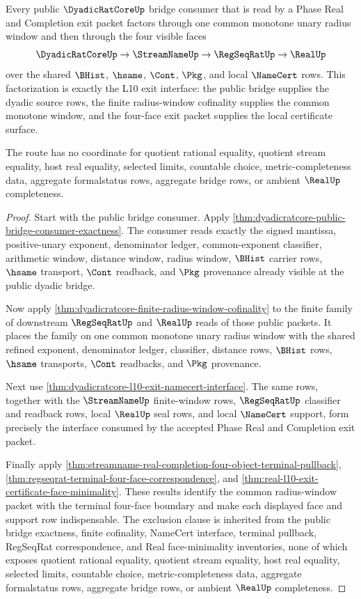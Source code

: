 \begin{theorem}
\label{thm:dyadicratcore-l10-exit-public-bridge-route}
Every public $\DyadicRatCoreUp$ bridge consumer that is read by a Phase Real and Completion exit packet factors through one common monotone unary radius window and then through the four visible faces
$$
\DyadicRatCoreUp \to \StreamNameUp \to \RegSeqRatUp \to \RealUp
$$
over the shared $\BHist$, $\hsame$, $\Cont$, $\Pkg$, and local $\NameCert$ rows. This factorization is exactly the L10 exit interface: the public bridge supplies the dyadic source rows, the finite radius-window cofinality supplies the common monotone window, and the four-face exit packet supplies the local certificate surface.

The route has no coordinate for quotient rational equality, quotient stream equality, host real equality, selected limits, countable choice, metric-completeness data, aggregate formalstatus rows, aggregate bridge rows, or ambient $\RealUp$ completeness.
\end{theorem}
\begin{proof}
Start with the public bridge consumer. Apply \autoref{thm:dyadicratcore-public-bridge-consumer-exactness}. The consumer reads exactly the signed mantissa, positive-unary exponent, denominator ledger, common-exponent classifier, arithmetic window, distance window, radius window, $\BHist$ carrier rows, $\hsame$ transport, $\Cont$ readback, and $\Pkg$ provenance already visible at the public dyadic bridge.

Now apply \autoref{thm:dyadicratcore-finite-radius-window-cofinality} to the finite family of downstream $\RegSeqRatUp$ and $\RealUp$ reads of those public packets. It places the family on one common monotone unary radius window with the shared refined exponent, denominator ledger, classifier, distance rows, $\BHist$ rows, $\hsame$ transports, $\Cont$ readbacks, and $\Pkg$ provenance.

Next use \autoref{thm:dyadicratcore-l10-exit-namecert-interface}. The same rows, together with the $\StreamNameUp$ finite-window rows, $\RegSeqRatUp$ classifier and readback rows, local $\RealUp$ seal rows, and local $\NameCert$ support, form precisely the interface consumed by the accepted Phase Real and Completion exit packet.

Finally apply \autoref{thm:streamname-real-completion-four-object-terminal-pullback}, \autoref{thm:regseqrat-terminal-four-face-correspondence}, and \autoref{thm:real-l10-exit-certificate-face-minimality}. These results identify the common radius-window packet with the terminal four-face boundary and make each displayed face and support row indispensable. The exclusion clause is inherited from the public bridge exactness, finite cofinality, NameCert interface, terminal pullback, RegSeqRat correspondence, and Real face-minimality inventories, none of which exposes quotient rational equality, quotient stream equality, host real equality, selected limits, countable choice, metric-completeness data, aggregate formalstatus rows, aggregate bridge rows, or ambient $\RealUp$ completeness.
\end{proof}

